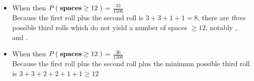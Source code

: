 \documentclass{ProblemSetCUNY}
\newcommand{\Prob}[1]{\ensuremath{P\Parens{#1}}\xspace}
\begin{document}
\begin{itemize}
\begin{itemize}
\item When  then \Prob{\textbf{spaces} \ge 12} = $\frac{33}{1506}$\\
Because the first roll plus the second roll is $3 + 3 + 1 + 1 = 8$, there are \emph{three} possible third rolls which do not yield a number of spaces $\ge 12$, notably  ,  and .
\item When  then \Prob{\textbf{spaces} \ge 12} = $\frac{36}{1506}$\\
Because the first roll plus the second roll plus the minimum possible third roll is $3 + 3 + 2 + 2 + 1 + 1 \ge 12$
\end{itemize}


\end{itemize}
\end{document}
